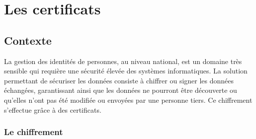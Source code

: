 \section{Les certificats}


\subsection{Contexte}

La gestion des identités de personnes, au niveau national, est un domaine très sensible qui requière une sécurité élevée des systèmes informatiques.
La solution permettant de sécuriser les données consiste à chiffrer ou signer les données échangées, garantissant ainsi que les données ne pourront être découverte ou qu'elles n'ont pas été modifiée ou envoyées par une personne tiers. Ce chiffrement s'effectue grâce à des certificats.


\subsubsection{Le chiffrement}


